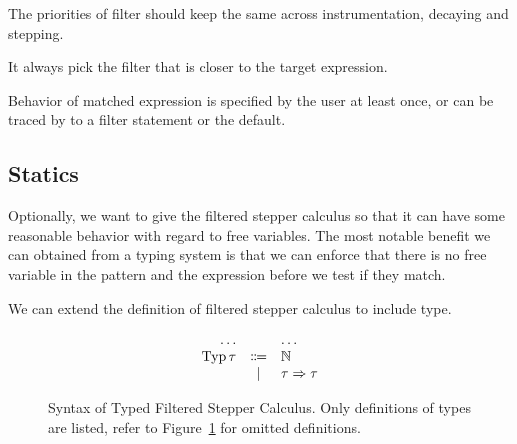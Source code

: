 



\begin{conjecture}
  The priorities of filter should keep the same across instrumentation, decaying and stepping.
\end{conjecture}


\begin{conjecture}
  It always pick the filter that is closer to the target expression.
\end{conjecture}

\begin{conjecture}
  Behavior of matched expression is specified by the user at least once, or can be traced by to a filter statement or the default.
\end{conjecture}

\subsection{Statics}

Optionally, we want to give the filtered stepper calculus so that it can have some reasonable behavior with regard to free variables. The most notable benefit we can obtained from a typing system is that we can enforce that there is no free variable in the pattern and the expression before we test if they match.

We can extend the definition of filtered stepper calculus to include type.
\begin{figure}[h]
  \begin{equation*}
    \begin{array}{rcl}
      \ldots       &         & \ldots \\
      \operatorname{Typ} \tau &\Coloneqq& \mathbb{N} \\
                   &\mid     & \tau \Rightarrow \tau
    \end{array}
  \end{equation*}
  \caption{Syntax of Typed Filtered Stepper Calculus. Only definitions of types are listed, refer to Figure~\ref{fig:filter-syntax} for omitted definitions.}
  \label{fig:filter-syntax}
\end{figure}

